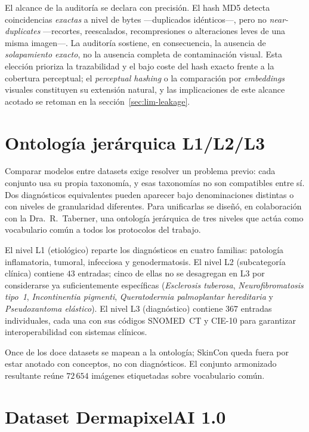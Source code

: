 El alcance de la auditoría se declara con precisión. El hash MD5
detecta coincidencias \emph{exactas} a nivel de bytes ---duplicados
idénticos---, pero no \emph{near-duplicates} ---recortes, reescalados,
recompresiones o alteraciones leves de una misma imagen---. La
auditoría sostiene, en consecuencia, la ausencia de \emph{solapamiento
exacto}, no la ausencia completa de contaminación visual. Esta
elección prioriza la trazabilidad y el bajo coste del hash exacto
frente a la cobertura perceptual; el \emph{perceptual hashing} o la
comparación por \emph{embeddings} visuales constituyen su extensión
natural, y las implicaciones de este alcance acotado se retoman en la
sección~\ref{sec:lim-leakage}.

\section{Ontología jerárquica L1/L2/L3}
\label{sec:ontologia}

Comparar modelos entre datasets exige resolver un problema previo:
cada conjunto usa su propia taxonomía, y esas taxonomías no son
compatibles entre sí. Dos diagnósticos equivalentes pueden aparecer
bajo denominaciones distintas o con niveles de granularidad
diferentes. Para unificarlas se diseñó, en colaboración
con la Dra.~R.~Taberner, una ontología jerárquica de tres niveles
que actúa como vocabulario común a todos los protocolos del trabajo.

El nivel L1 (etiológico) reparte los diagnósticos en cuatro
familias: patología inflamatoria, tumoral, infecciosa y
genodermatosis. El nivel L2 (subcategoría clínica) contiene
$43$ entradas; cinco de ellas no se desagregan en L3 por
considerarse ya suficientemente específicas (\emph{Esclerosis
tuberosa}, \emph{Neurofibromatosis tipo~1}, \emph{Incontinentia
pigmenti}, \emph{Queratodermia palmoplantar hereditaria} y
\emph{Pseudoxantoma elástico}). El nivel L3 (diagnóstico) contiene
$367$ entradas individuales, cada una con sus códigos SNOMED~CT y
CIE-10 para garantizar interoperabilidad con sistemas clínicos.

Once de los doce datasets se mapean a la ontología; SkinCon queda
fuera por estar anotado con conceptos, no con diagnósticos. El
conjunto armonizado resultante reúne $72\,654$ imágenes etiquetadas
sobre vocabulario común.

\section{Dataset DermapixelAI 1.0}
\label{sec:dermapixel}

